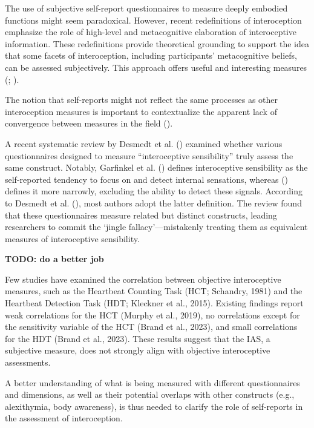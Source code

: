 \documentclass[
  man,
  floatsintext,
  longtable,
  nolmodern,
  notxfonts,
  notimes,
  colorlinks=true,linkcolor=blue,citecolor=blue,urlcolor=blue]{apa7}
\begin{document}
The use of subjective self-report questionnaires to measure deeply
embodied functions might seem paradoxical. However, recent redefinitions
of interoception emphasize the role of high-level and metacognitive
elaboration of interoceptive information. These redefinitions provide
theoretical grounding to support the idea that some facets of
interoception, including participants' metacognitive beliefs, can be
assessed subjectively. This approach offers useful and interesting
measures (;
).

The notion that self-reports might not reflect the same processes as
other interoception measures is important to contextualize the apparent
lack of convergence between measures in the field
().

A recent systematic review by Desmedt et al.
() examined whether various
questionnaires designed to measure ``interoceptive sensibility'' truly
assess the same construct. Notably, Garfinkel et al.
() defines interoceptive
sensibility as the self-reported tendency to focus on and detect
internal sensations, whereas
()
defines it more narrowly, excluding the ability to detect these signals.
According to Desmedt et al. (),
most authors adopt the latter definition. The review found that these
questionnaires measure related but distinct constructs, leading
researchers to commit the `jingle fallacy'---mistakenly treating them as
equivalent measures of interoceptive sensibility.

\textbf{TODO: do a better job}

Few studies have examined the correlation between objective
interoceptive measures, such as the Heartbeat Counting Task (HCT;
Schandry, 1981) and the Heartbeat Detection Task (HDT; Kleckner et al.,
2015). Existing findings report weak correlations for the HCT (Murphy et
al., 2019), no correlations except for the sensitivity variable of the
HCT (Brand et al., 2023), and small correlations for the HDT (Brand et
al., 2023). These results suggest that the IAS, a subjective measure,
does not strongly align with objective interoceptive assessments.

A better understanding of what is being measured with different
questionnaires and dimensions, as well as their potential overlaps with
other constructs (e.g., alexithymia, body awareness), is thus needed to
clarify the role of self-reports in the assessment of interoception.
\end{document}
